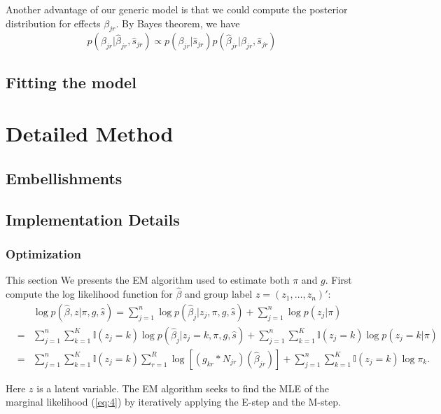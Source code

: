 \documentclass[11pt]{article}
\begin{document}
Another advantage of our generic model is that we could compute the posterior distribution for effects $\beta_{jr}$. By Bayes theorem, we have
\begin{equation}
    p(\beta_{jr}|\hat\beta_{jr},\hat s_{jr}) \propto p(\beta_{jr}|\hat s_{jr})p(\hat\beta_{jr}|\beta_{jr},\hat s_{jr})
\end{equation}

\subsection{Fitting the model}

\section{Detailed Method}

\subsection{Embellishments}

\subsection{Implementation Details}

\subsubsection{Optimization}
This section We presents the EM algorithm used to estimate both $\pi$ and $g$. First compute the log likelihood function for $\hat\beta$ and group label $z=(z_1,\ldots,z_n)'$:
\begin{eqnarray}
    &&\log p(\hat\beta,z|\pi,g,\hat s) = \sum_{j=1}^n\log p(\hat\beta_j|z_j,\pi,g,\hat s)+\sum_{j=1}^n\log p(z_j|\pi) \nonumber\\
    &=& \sum_{j=1}^n\sum_{k=1}^K\mathbb{I}(z_j=k)\log p(\hat\beta_j|z_j=k,\pi,g,\hat s)
    +\sum_{j=1}^n\sum_{k=1}^K\mathbb{I}(z_j=k)\log p(z_j=k|\pi)\nonumber\\
    &=& \sum_{j=1}^n\sum_{k=1}^K\mathbb{I}(z_j=k)\sum_{r=1}^R\log \left[(g_{kr}*N_{jr})(\hat\beta_{jr}) \right]+\sum_{j=1}^n\sum_{k=1}^K\mathbb{I}(z_j=k)\log\pi_k.
\end{eqnarray}

Here $z$ is a latent variable. The EM algorithm seeks to find the MLE of the marginal likelihood (\ref{eq:4}) by iteratively applying the E-step and the M-step.
\end{document}
